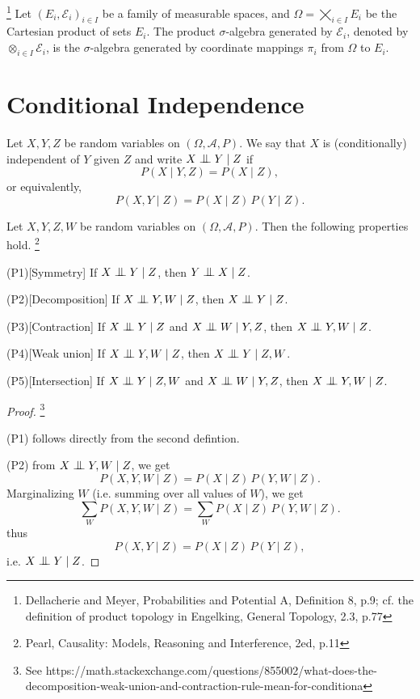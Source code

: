 \begin{definition}
\footnote{Dellacherie and Meyer, Probabilities and Potential A, Definition 8, 
p.9; cf. the definition of product topology in Engelking, General Topology,
2.3, p.77}
Let $(E_i,\mathcal{E}_i)_{i\in I}$ be a family of measurable spaces, and 
$\Omega=\bigtimes_{i\in I} E_i$ be the Cartesian product of sets $E_i$.
The product $\sigma$-algebra generated by $\mathcal{E}_i$, denoted by
$\otimes_{i\in I} \mathcal{E}_i$, is the $\sigma$-algebra generated by 
coordinate mappings $\pi_i$ from $\Omega$ to $E_i$. 
\end{definition}

\section{Conditional Independence}

\begin{definition}
Let $X,Y,Z$ be random variables on $(\Omega,\mathcal{A},P)$. We say that $X$ is
(conditionally) independent of $Y$ given $Z$ and write $X\bigCI Y \mid Z$ if
\[
  P(X \mid Y,Z) = P(X \mid Z),
\]
or equivalently,
\[
  P(X,Y \mid Z) = P(X \mid Z) \, P(Y \mid Z).
\]
\end{definition}

\begin{lemma}
Let $X,Y,Z,W$ be random variables on $(\Omega,\mathcal{A},P)$. Then the
following properties hold.
\footnote{Pearl, Causality: Models, Reasoning and Interference, 2ed, p.11}

(P1)[Symmetry] If $X\bigCI Y \mid Z$, then $Y\bigCI X \mid Z$.

(P2)[Decomposition] If $X\bigCI Y,W \mid Z$, then $X\bigCI Y\mid Z$.

(P3)[Contraction] If $X\bigCI Y \mid Z$ and $X\bigCI W \mid Y,Z$, 
    then $X\bigCI Y,W\mid Z$.

(P4)[Weak union] If $X\bigCI Y,W \mid Z$, then $X\bigCI Y\mid Z,W$.

(P5)[Intersection] If $X\bigCI Y\mid Z,W$ and $X\bigCI W\mid Y,Z$, 
    then $X\bigCI Y,W\mid Z$.
\end{lemma}
\begin{proof}
\footnote{See
https://math.stackexchange.com/questions/855002/what-does-the-decomposition-weak-union-and-contraction-rule-mean-for-conditiona}

(P1) follows directly from the second defintion.

(P2) from $X\bigCI Y,W \mid Z$, we get
\[
  P(X,Y,W\mid Z) = P(X\mid Z) \, P(Y,W\mid Z).
\]
Marginalizing $W$ (i.e. summing over all values of $W$), we get
\[
  \sum_W P(X,Y,W\mid Z) = \sum_W P(X\mid Z) \, P(Y,W\mid Z).
\]
thus
\[
  P(X,Y\mid Z) = P(X\mid Z) \, P(Y\mid Z),
\]
i.e. $X\bigCI Y\mid Z$.



\end{proof}



